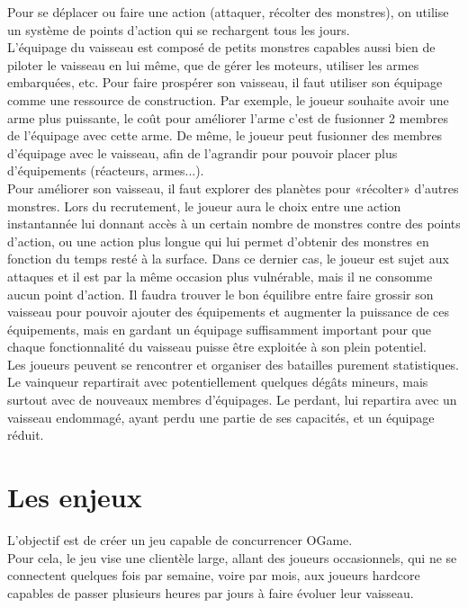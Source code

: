 \documentclass[a4paper,11pt]{report}
\begin{document}
    Pour se déplacer ou faire une action (attaquer, récolter des monstres), on utilise un système de points d'action qui se rechargent tous les jours.\\

    L’équipage du vaisseau est composé de petits monstres capables aussi bien de piloter le vaisseau en lui même, que de gérer les moteurs, utiliser les armes embarquées, etc. Pour faire prospérer son vaisseau, il faut utiliser son équipage comme une ressource de construction. Par exemple, le joueur souhaite avoir une arme plus puissante, le coût pour améliorer l’arme c’est de fusionner 2 membres de l’équipage avec cette arme. De même, le joueur peut fusionner des membres d'équipage avec le vaisseau, afin de l'agrandir pour pouvoir placer plus d'équipements (réacteurs, armes...).\\

    Pour améliorer son vaisseau, il faut explorer des planètes pour «récolter» d’autres monstres. Lors du recrutement, le joueur aura le choix entre une action instantannée lui donnant accès à un certain nombre de monstres contre des points d'action, ou une action plus longue qui lui permet d'obtenir des monstres en fonction du temps resté à la surface. Dans ce dernier cas, le joueur est sujet aux attaques et il est par la même occasion plus vulnérable, mais il ne consomme aucun point d'action. Il faudra trouver le bon équilibre entre faire grossir son vaisseau pour pouvoir ajouter des équipements et augmenter la puissance de ces équipements, mais en gardant un équipage suffisamment important pour que chaque fonctionnalité du vaisseau puisse être exploitée à son plein potentiel.\\

    Les joueurs peuvent se rencontrer et organiser des batailles purement statistiques. Le vainqueur repartirait avec potentiellement quelques dégâts mineurs, mais surtout avec de nouveaux membres d’équipages. Le perdant, lui repartira avec un vaisseau endommagé, ayant perdu une partie de ses capacités, et un équipage réduit.\\

    \section{Les enjeux}
    L'objectif est de créer un jeu capable de concurrencer OGame.\\

    Pour cela, le jeu vise une clientèle large, allant des joueurs occasionnels, qui ne se connectent quelques fois par semaine, voire par mois, aux joueurs hardcore capables de passer plusieurs heures par jours à faire évoluer leur vaisseau.\\
\end{document}
